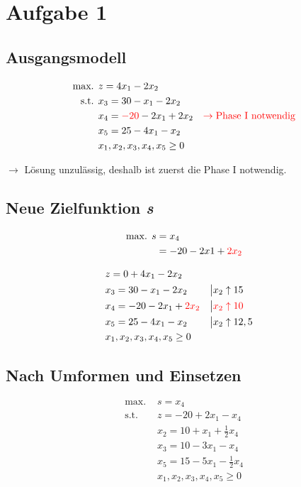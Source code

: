 \documentclass[a4paper,11pt]{article}
\begin{document}
\raggedright %


\section*{Aufgabe 1}
\subsection*{Ausgangsmodell}
\begin{align*}
\text{max. } & z = 4x_1 - 2x_2 \\
\text{s.t. } & x_3 = 30 - x_1 - 2x_2 \\
& x_4 = {\color{red} -20} - 2x_1 + 2x_2  & \color{red} \to \text{Phase I notwendig} \\
& x_5 = 25 -4x_1 - x_2 \\
& x_1, x_2, x_3, x_4, x_5 \ge 0 \\
\end{align*}

$\to$ Lösung unzulässig, deshalb ist zuerst die Phase I notwendig. \\

\subsection*{Neue Zielfunktion \emph{s}}
\begin{align*}
\text{max. } s &= x_4 \\
&= -20 - 2x1 + {\color{red} 2x_2}
\end{align*}

\begin{align*}
& z = 0 + 4x_1 - 2x_2 \\
& x_3 = 30 - x_1 - 2x_2 &&\big| x_2 \uparrow 15 \\
& x_4 = -20 - 2x_1 + {\color{red} 2x_2} &&\big| \color{red} x_2 \uparrow 10 \\
& x_5 = 25 -4x_1 - x_2 &&\big| x_2 \uparrow 12,5 \\
& x_1, x_2, x_3, x_4, x_5 \ge 0 \\
\end{align*}

\subsection*{Nach Umformen und Einsetzen}
\begin{align*}
\text{max. } & s = x_4 \\
\text{s.t. } & z = -20 + 2x_1 - x_4 \\
& x_2 = 10 + x_1 + \frac{1}{2}x_4 \\
& x_3 = 10 - 3x_1 - x_4 \\
& x_5 = 15 - 5x_1 - \frac{1}{2}x_4 \\
& x_1, x_2, x_3, x_4, x_5 \ge 0
\end{align*}
\end{document}
